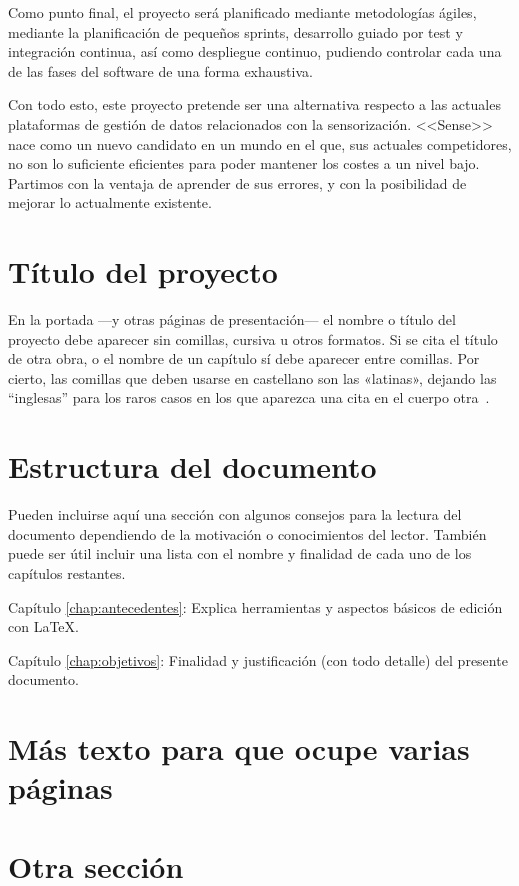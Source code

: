 Como punto final, el proyecto será planificado mediante metodologías ágiles,
mediante la planificación de pequeños sprints, desarrollo guiado por
test y integración continua, así como despliegue continuo, pudiendo controlar
cada una de las fases del software de una forma exhaustiva.

Con todo esto, este proyecto pretende ser una alternativa respecto a las actuales plataformas de
gestión de datos relacionados con la sensorización. <<Sense>>  nace como un nuevo
candidato en un mundo en el que, sus actuales competidores, no son lo suficiente
eficientes para poder mantener los costes a un nivel bajo. Partimos con la
ventaja de aprender de sus errores, y con la posibilidad de mejorar lo
actualmente existente.


\section{Título del proyecto}

En la portada ---y otras páginas de presentación--- el nombre o título del
proyecto debe aparecer sin comillas, cursiva u otros formatos. Si se cita el
título de otra obra, o el nombre de un capítulo sí debe aparecer entre
comillas. Por cierto, las comillas que deben usarse en castellano son las
«latinas», dejando las ``inglesas'' para los raros casos en los que aparezca una
cita en el cuerpo otra~\cite{sousa}.


\section{Estructura del documento}

Pueden incluirse aquí una sección con algunos consejos para la lectura del
documento dependiendo de la motivación o conocimientos del lector.  También
puede ser útil incluir una lista con el nombre y finalidad de cada uno de los
capítulos restantes.

\begin{definitionlist}
\item[Capítulo \ref{chap:antecedentes}: \nameref{chap:antecedentes}] Explica herramientas
  y aspectos básicos de edición con \LaTeX.
\item[Capítulo \ref{chap:objetivos}: \nameref{chap:objetivos}] Finalidad y justificación
  (con todo detalle) del presente documento.
\end{definitionlist}


\section{Más texto para que ocupe varias páginas}

\blindtext
\blinditemize[4]
\blindmathpaper

\section{Otra sección}

\blindtext


